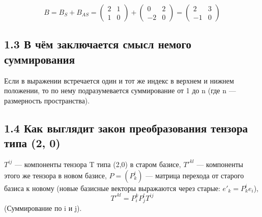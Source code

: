 \documentclass{article}
\begin{document}
\[B = B_S + B_{AS} = \begin{pmatrix} 2 & 1 \\ 1 & 0 \end{pmatrix} + \begin{pmatrix} 0 & 2 \\ -2 & 0 \end{pmatrix} = \begin{pmatrix} 2 & 3 \\ -1 & 0 \end{pmatrix}\]

\subsection*{1.3 В чём заключается смысл немого суммирования}
Если в выражении встречается один и тот же индекс в верхнем и нижнем положении, то по нему подразумевается суммирование от 1 до n (где n — размерность пространства).

\subsection*{1.4 Как выглядит закон преобразования тензора типа (2, 0)}
\(T^{ij}\) — компоненты тензора T типа (2,0) в старом базисе,
\(T'^{kl}\) — компоненты этого же тензора в новом базисе,
\(P = (P^i_k)\) — матрица перехода от старого базиса к новому (новые базисные векторы выражаются через старые: \(e'_k = P^i_k e_i\)),
\[T'^{kl} = P^k_i P^l_j T^{ij}\]
(Суммирование по i и j).
\end{document}

